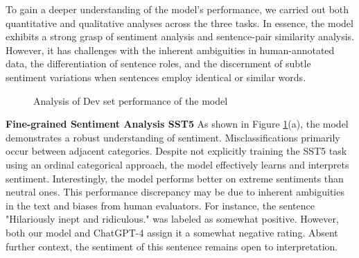 \documentclass{article}
\begin{document}
To gain a deeper understanding of the model's performance, we carried out both quantitative and 
qualitative analyses across the three tasks. In essence, the model exhibits a strong grasp of 
sentiment analysis and sentence-pair similarity analysis. However, it has challenges with the inherent 
ambiguities in human-annotated data, the differentiation of sentence roles, and the discernment 
of subtle sentiment variations when sentences employ identical or similar words.

\begin{figure}[H]%
  \centering
  \hfill
  \hfill
  \caption{Analysis of Dev set performance of the model
  }%
  \label{fig:analysis}%
\end{figure}

\textbf{Fine-grained Sentiment Analysis SST5} As shown in Figure \ref{fig:analysis}(a), 
the model demonstrates a robust understanding of sentiment. Misclassifications primarily 
occur between adjacent categories. Despite not explicitly training the SST5 task using an 
ordinal categorical approach, the model effectively learns and interprets sentiment. 
Interestingly, the model performs better on extreme sentiments than neutral ones. This 
performance discrepancy may be due to inherent ambiguities in the text and biases from human 
evaluators. For instance, the sentence "Hilariously inept and ridiculous." was labeled as 
somewhat positive. However, both our model and ChatGPT-4 assign it a 
somewhat negative rating. Absent further context, the sentiment of this sentence remains 
open to interpretation.
\end{document}
